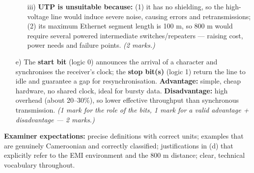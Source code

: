 \documentclass[11pt]{article}
\begin{document}
\begin{corrige}
\begin{enumerate}
\begin{itemize}
\item[iii)] \textbf{UTP is unsuitable because:} (1) it has no shielding, so the high-voltage line would induce severe noise, causing errors and retransmissions; (2) its maximum Ethernet segment length is 100 m, so 800 m would require several powered intermediate switches/repeaters — raising cost, power needs and failure points. \emph{(2 marks.)}
\end{itemize}
\item[e)] The \textbf{start bit} (logic 0) announces the arrival of a character and synchronises the receiver's clock; the \textbf{stop bit(s)} (logic 1) return the line to idle and guarantee a gap for resynchronisation. \textbf{Advantage:} simple, cheap hardware, no shared clock, ideal for bursty data. \textbf{Disadvantage:} high overhead (about 20--30\%), so lower effective throughput than synchronous transmission. \emph{(1 mark for the role of the bits, 1 mark for a valid advantage + disadvantage — 2 marks.)}
\end{enumerate}

\textbf{Examiner expectations:} precise definitions with correct units; examples that are genuinely Cameroonian and correctly classified; justifications in (d) that explicitly refer to the EMI environment and the 800 m distance; clear, technical vocabulary throughout.
\end{corrige}
\end{document}
